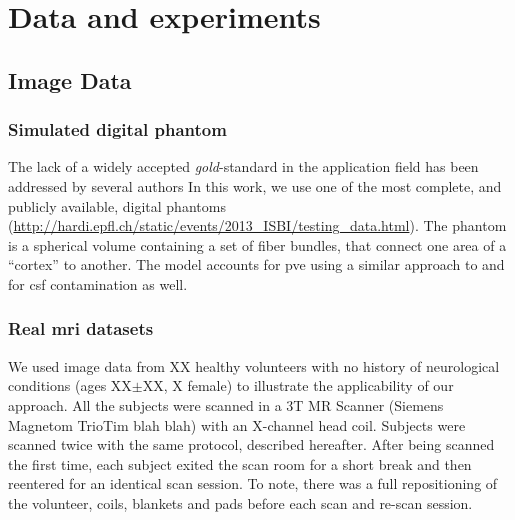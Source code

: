 \section{Data and experiments}
\label{sec:experiments}
%


\subsection{Image Data}
\label{sec:datasets}

\subsubsection{Simulated digital phantom} %
%
The lack of a widely accepted \emph{gold}-standard in the application
field has been addressed by several authors \citep{cote_tractometer:_2013}
In this work, we use one of the most complete, and publicly available,
digital phantoms (\url{http://hardi.epfl.ch/static/events/2013_ISBI/testing_data.html}).
The phantom is a spherical volume containing a set of fiber bundles, that connect 
one area of a ``cortex'' to another. The model accounts for \gls{pve} using 
a similar approach to \citep{close_software_2009} and for \gls{csf} contamination
as well.

\subsubsection{Real \gls{mri} datasets} %
%
We used image data from XX healthy volunteers with no history of neurological
conditions (ages XX$\pm$XX, X female) to illustrate the applicability of our 
approach. All the subjects were scanned in a 3T MR Scanner (Siemens Magnetom
TrioTim blah blah)
with an X-channel head coil. Subjects were scanned twice with the same protocol,
described hereafter. After being scanned the first time, each subject exited the
scan room for a short break and then reentered for an identical scan session.
To note, there was a full repositioning of the volunteer, coils, blankets and pads
before each scan and re-scan session.


